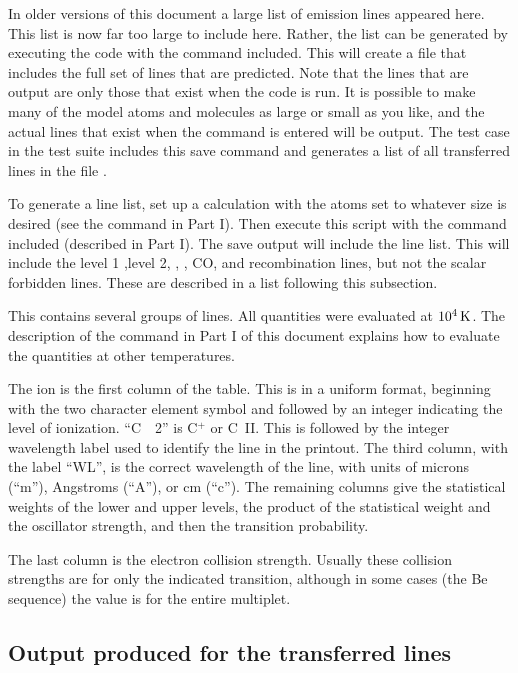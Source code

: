 In older versions of this document a large list of emission lines
appeared here.
This list is now far too large to include here.
Rather,
the list can be generated by executing the code with the command  included.
This will create a file that includes the
full set of lines that are predicted.
Note that the lines that are output
are only those that exist when the code is run.
It is possible to make
many of the model atoms and molecules as large or small as you like,
and
the actual lines that exist when the  command
is entered will be output.
The test case  in the test suite
includes this save command and generates a list of all transferred
lines in the file .

To generate a line list, set up a calculation with the atoms set to
whatever size is desired (see the  command in Part I).  Then execute
this script with the  command included (described in Part I).
The save output will include the line list.
This will include the
level 1 ,level 2, \htwo, \feii, CO, and recombination lines,
but not the scalar forbidden lines.
These are described in a list following this subsection.

This contains several groups of lines.
All quantities were evaluated at $10^4 {\rm\thinspace K}$.
The description of the command in Part I of this document explains
how to evaluate the quantities at other temperatures.

The ion is the first column of the table.
This is in a uniform format,
beginning with the two character element symbol and followed by an integer
indicating the level of ionization.
``C~~2'' is C$^+$ or C~II.
This is
followed by the integer wavelength label used to identify the line in the
printout.
The third column, with the label ``WL'', is the correct wavelength
of the line, with units of microns (``m''), Angstroms (``A''),
or cm (``c'').
The remaining columns give the statistical weights of the lower and upper
levels, the product of the statistical weight and the oscillator strength,
and then the transition probability.

The last column is the electron collision strength.
Usually these collision strengths
are for only the indicated transition, although in some cases (the Be
sequence) the value is for the entire multiplet.

\subsection{Output produced for the transferred lines}

